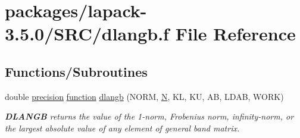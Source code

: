 \hypertarget{dlangb_8f}{}\section{packages/lapack-\/3.5.0/\+S\+R\+C/dlangb.f File Reference}
\label{dlangb_8f}
\subsection*{Functions/\+Subroutines}
\begin{DoxyCompactItemize}
\item 
double \hyperlink{numinquire_8h_a2c8e616467665d0b2814d4c1589ba74e}{precision} \hyperlink{afunc_8m_a7b5e596df91eadea6c537c0825e894a7}{function} \hyperlink{group__doubleGBauxiliary_gaef2185b66fc7b07324cb1dcb622ea238}{dlangb} (N\+O\+R\+M, \hyperlink{polmisc_8c_a0240ac851181b84ac374872dc5434ee4}{N}, K\+L, K\+U, A\+B, L\+D\+A\+B, W\+O\+R\+K)
\begin{DoxyCompactList}\small\item\em {\bfseries D\+L\+A\+N\+G\+B} returns the value of the 1-\/norm, Frobenius norm, infinity-\/norm, or the largest absolute value of any element of general band matrix. \end{DoxyCompactList}\end{DoxyCompactItemize}
